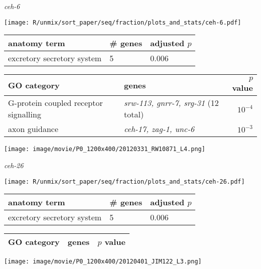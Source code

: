 \documentclass[serif,9pt]{beamer}
\begin{document}
\begin{frame}{{\em ceh-6}}

\begin{minipage}{0.4\textwidth}
\texttt{[image: R/unmix/sort\_paper/seq/fraction/plots\_and\_stats/ceh-6.pdf]}
\end{minipage}
\begin{minipage}{0.58\textwidth}
\begin{table}[!tbp]\scriptsize
\begin{tabular}{lll}
anatomy term & \# genes & adjusted $p$ \\
\hline
excretory secretory system & 5 & 0.006 
\end{tabular}
\end{table}
\end{minipage}

\begin{table}\footnotesize
\begin{tabular}{llr}
GO category & genes & $p$ value \\
\hline
G-protein coupled receptor signalling & {\em srw-113, gnrr-7, srg-31} (12 total) & $10^{-4}$ \\
axon guidance & {\em ceh-17, zag-1, unc-6} & $10^{-3}$ \\
\end{tabular}
\end{table}

\texttt{[image: image/movie/P0\_1200x400/20120331\_RW10871\_L4.png]}

\end{frame}

\begin{frame}{{\em ceh-26}}

\begin{minipage}{0.4\textwidth}
\texttt{[image: R/unmix/sort\_paper/seq/fraction/plots\_and\_stats/ceh-26.pdf]}
\end{minipage}
\begin{minipage}{0.58\textwidth}
\begin{table}[!tbp]\scriptsize
\begin{tabular}{lll}
anatomy term & \# genes & adjusted $p$ \\
\hline
excretory secretory system & 5 & 0.006 
\end{tabular}
\end{table}
\end{minipage}

\begin{table}\footnotesize
\begin{tabular}{llr}
GO category & genes & $p$ value \\
\hline

\end{tabular}
\end{table}

\texttt{[image: image/movie/P0\_1200x400/20120401\_JIM122\_L3.png]}

\end{frame}
\end{document}
